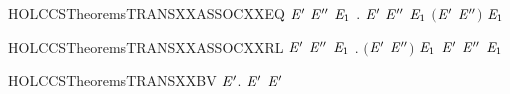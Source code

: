 \newcommand{\HOLCCSTheoremsSUMXXcasesXXEQ}{\UseVerbatim{HOLCCSTheoremsSUMXXcasesXXEQ}}
\begin{SaveVerbatim}{HOLCCSTheoremsTRANSXXASSOCXXEQ}
\HOLTokenTurnstile{} \HOLSymConst{\HOLTokenForall{}} \ensuremath{\HOLBoundVar{E}\sp{\prime}} \ensuremath{\HOLBoundVar{E}\sp{\prime\prime}} \ensuremath{\HOLBoundVar{E}\sb{\mathrm{1}}} .  \HOLSymConst{\ensuremath{+}} \ensuremath{\HOLBoundVar{E}\sp{\prime}} \HOLSymConst{\ensuremath{+}} \ensuremath{\HOLBoundVar{E}\sp{\prime\prime}} \HOLTokenTransBegin{}\HOLTokenTransEnd \ensuremath{\HOLBoundVar{E}\sb{\mathrm{1}}} \HOLSymConst{\HOLTokenEquiv{}}  \HOLSymConst{\ensuremath{+}} \ensuremath{(}\ensuremath{\HOLBoundVar{E}\sp{\prime}} \HOLSymConst{\ensuremath{+}} \ensuremath{\HOLBoundVar{E}\sp{\prime\prime}}\ensuremath{)} \HOLTokenTransBegin{}\HOLTokenTransEnd \ensuremath{\HOLBoundVar{E}\sb{\mathrm{1}}}
\end{SaveVerbatim}
\newcommand{\HOLCCSTheoremsTRANSXXASSOCXXEQ}{\UseVerbatim{HOLCCSTheoremsTRANSXXASSOCXXEQ}}
\begin{SaveVerbatim}{HOLCCSTheoremsTRANSXXASSOCXXRL}
\HOLTokenTurnstile{} \HOLSymConst{\HOLTokenForall{}} \ensuremath{\HOLBoundVar{E}\sp{\prime}} \ensuremath{\HOLBoundVar{E}\sp{\prime\prime}} \ensuremath{\HOLBoundVar{E}\sb{\mathrm{1}}} .  \HOLSymConst{\ensuremath{+}} \ensuremath{(}\ensuremath{\HOLBoundVar{E}\sp{\prime}} \HOLSymConst{\ensuremath{+}} \ensuremath{\HOLBoundVar{E}\sp{\prime\prime}}\ensuremath{)} \HOLTokenTransBegin{}\HOLTokenTransEnd \ensuremath{\HOLBoundVar{E}\sb{\mathrm{1}}} \HOLSymConst{\HOLTokenImp{}}  \HOLSymConst{\ensuremath{+}} \ensuremath{\HOLBoundVar{E}\sp{\prime}} \HOLSymConst{\ensuremath{+}} \ensuremath{\HOLBoundVar{E}\sp{\prime\prime}} \HOLTokenTransBegin{}\HOLTokenTransEnd \ensuremath{\HOLBoundVar{E}\sb{\mathrm{1}}}
\end{SaveVerbatim}
\newcommand{\HOLCCSTheoremsTRANSXXASSOCXXRL}{\UseVerbatim{HOLCCSTheoremsTRANSXXASSOCXXRL}}
\begin{SaveVerbatim}{HOLCCSTheoremsTRANSXXBV}
\HOLTokenTurnstile{} \HOLSymConst{\HOLTokenForall{}}  \ensuremath{\HOLBoundVar{E}\sp{\prime}}.  \HOLTokenTransBegin{}\HOLTokenTransEnd \ensuremath{\HOLBoundVar{E}\sp{\prime}} \HOLSymConst{\HOLTokenImp{}}  \ensuremath{\HOLBoundVar{E}\sp{\prime}} \HOLConst{\HOLTokenSubset{}}  
\end{SaveVerbatim}
